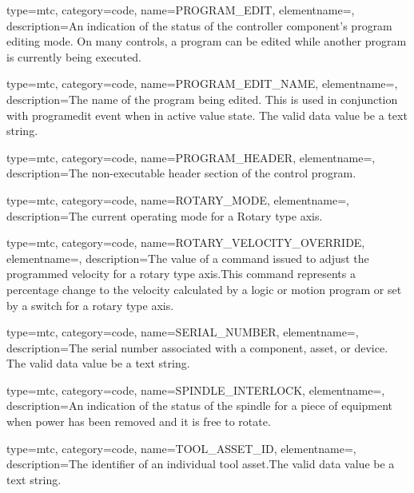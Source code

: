 {
  type=mtc,
  category=code,
  name={PROGRAM\_EDIT},
  elementname=,
  description={An indication of the status of the \gls{controller} component’s program editing mode. \newline On many controls, a program can be edited while another program is currently being executed.}
}

{
  type=mtc,
  category=code,
  name={PROGRAM\_EDIT\_NAME},
  elementname=,
  description={The name of the program being edited. \newline This is used in conjunction with \gls{programedit event} when in \gls{active value} state. \newline The \gls{valid data value} \must be a text string.}
}

{
  type=mtc,
  category=code,
  name={PROGRAM\_HEADER},
  elementname=,
  description={The non-executable header section of the control program.}
}

{
  type=mtc,
  category=code,
  name={ROTARY\_MODE},
  elementname=,
  description={The current operating mode for a Rotary type axis.}
}

{
  type=mtc,
  category=code,
  name={ROTARY\_VELOCITY\_OVERRIDE},
  elementname=,
  description={The value of a command issued to adjust the programmed velocity for a \gls{rotary} type axis.This command represents a percentage change to the velocity calculated by a logic or motion program or set by a switch for a \gls{rotary} type axis.}
}

{
  type=mtc,
  category=code,
  name={SERIAL\_NUMBER},
  elementname=,
  description={The serial number associated with a \gls{component}, \gls{asset}, or \gls{device}. The \gls{valid data value} \must be a text string.}
}

{
  type=mtc,
  category=code,
  name={SPINDLE\_INTERLOCK},
  elementname=,
  description={An indication of the status of the spindle for a piece of equipment when power has been removed and it is free to rotate.}
}

{
  type=mtc,
  category=code,
  name={TOOL\_ASSET\_ID},
  elementname=,
  description={The identifier of an individual tool asset.The \gls{valid data value} \must be a text string.}
}

